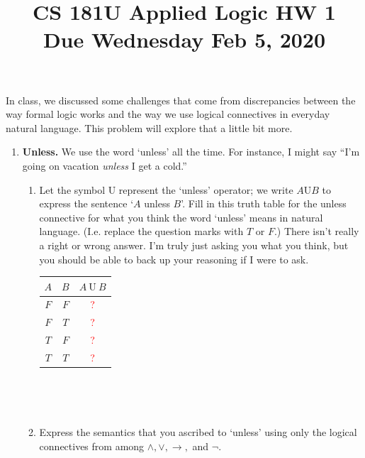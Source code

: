\documentclass[12pt]{article}
\title{CS 181U Applied Logic HW 1 \\ Due Wednesday Feb 5, 2020}
\date{}
\author{\todo{Your Name Goes Here}}
\newcommand{\todo}[1]{\textcolor{red}{#1}}
\newenvironment{problem}[2][Problem]{\begin{trivlist}
\item[\hskip \labelsep {\bfseries #1}\hskip \labelsep {\bfseries #2.}]}{\end{trivlist}}
\begin{document}
\maketitle

 
\begin{problem}{1} In class, we discussed some challenges that come from discrepancies between the way formal logic works and the way we use logical connectives in everyday natural language. This problem will explore that a little bit more.  

\begin{enumerate}[label=\Alph*.]

\item \textbf{Unless.} We use the word `unless' all the time. For instance, I might say ``I'm going on vacation \textit{unless} I get a cold.''


\begin{enumerate}[label=\roman*.]

\item Let the symbol $\mathrm{U}$ represent the `unless' operator; we write $A \mathrm{U} B$ to express the sentence `$A$ unless $B$'. Fill in this truth table for the unless connective for what you think the word `unless' means in natural language. (I.e. replace the question marks with $T$ or $F$.) There isn't really a right or wrong answer. I'm truly just asking you what you think, but you should be able to back up your reasoning if I were to ask. \\

\begin{center}
\begin{tabular}{|c|c||c|}
\hline
$A$ & $B$ & $A \ \mathrm{U} \ B$ \\ \hline \hline
$F$ & $F$ & \todo{?} \\ \hline
$F$ & $T$ & \todo{?} \\ \hline
$T$ & $F$ & \todo{?} \\ \hline
$T$ & $T$ & \todo{?} \\ \hline
\end{tabular} \\ 
\end{center} 

~ \\

\item Express the semantics that you ascribed to `unless' using only the logical connectives from among $\land, \lor, \rightarrow, $ and $\neg$. \\


\end{enumerate}
\end{enumerate}
\end{problem}
\end{document}
